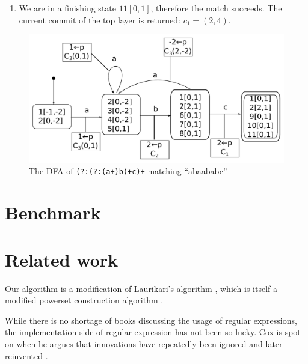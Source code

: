 \documentclass[english]{sigplanconf}
\theoremstyle{definition}
\begin{document}
\begin{enumerate}
\begin{enumerate}
\item We are in a finishing state $11[0,1]$, therefore the match succeeds.
The current commit of the top layer is returned: $c_{1}=(2,4)$.
\end{enumerate}
\end{enumerate}
\begin{figure}
\includegraphics[width=\linewidth]{graphs/abc-dfa}

\caption{\label{fig:lazy-dfa}The DFA of \texttt{(?:(?:(a+)b)+c)+} matching
``abaababc''}


\end{figure}

\section{Benchmark}


\section{Related work}
Our algorithm is a modification of Laurikari's algorithm \cite{laurikari2000nfas},
which is itself a modified powerset construction algorithm \cite[p. 55]{Sipser2005}.

While there is no shortage of books discussing the usage of regular
expressions, the implementation side of regular expression has not
been so lucky. Cox is spot-on when he argues that innovations have
repeatedly been ignored and later reinvented \cite{Cox2007}. 
\end{document}
